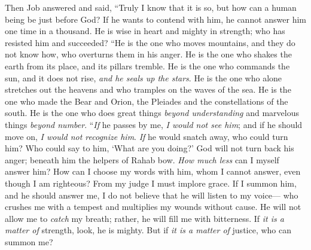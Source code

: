 \begin{biblechapter} %
 Then Job answered and said,
\verse “Truly I know that it is so, 
but how can a human being be just before God?
\verse If he wants to contend with him, 
he cannot answer him one time in a thousand.
\verse He is wise in heart and mighty in strength; 
who has resisted him and succeeded?
\verse “He is the one who moves mountains, and they do not know how, 
who overturns them in his anger.
\verse He is the one who shakes the earth from its place, 
and its pillars tremble.
\verse He is the one who commands the sun, and it does not rise, 
\textit{and he seals up the stars}.
\verse He is the one who alone stretches out the heavens 
and who tramples on the waves of the sea.
\verse He is the one who made the Bear and Orion, 
the Pleiades and the constellations of the south.
\verse He is the one who does great things \textit{beyond understanding} 
and marvelous things \textit{beyond number}.
\verse “\textit{If} he passes by me, \textit{I would not see him}; 
and if he should move on, \textit{I would not recognize him}.
\verse \textit{If} he would snatch away, who could turn him? 
Who could say to him, ‘What are you doing?’
\verse God will not turn back his anger; 
beneath him the helpers of Rahab bow.
\verse \textit{How much less} can I myself answer him? 
How can I choose my words with him,
\verse whom I cannot answer, even though I am righteous? 
From my judge I must implore grace.
\verse If I summon him, and he should answer me, 
I do not believe that he will listen to my voice—
\verse who crushes me with a tempest 
and multiplies my wounds without cause.
\verse He will not allow me to \textit{catch} my breath; 
rather, he will fill me with bitterness.
\verse If \textit{it is a matter of} strength, look, he is mighty. 
But if \textit{it is a matter of} justice, who can summon me?

\end{biblechapter}
